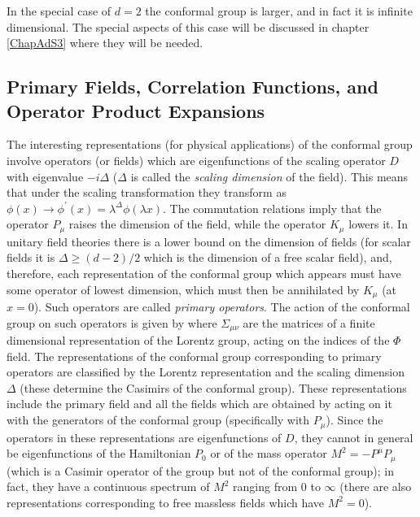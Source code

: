 In the special case of $d=2$ the conformal group is larger, and in
fact it is infinite dimensional. The special aspects of this case will
be discussed in chapter \ref{ChapAdS3} where they will be needed.

\subsection{Primary Fields, Correlation Functions, and Operator Product
Expansions}
\label{primaries}

The interesting representations (for physical applications) of the
conformal group involve operators (or fields) which are eigenfunctions
of the scaling operator $D$ with eigenvalue $-i\Delta$ ($\Delta$ is
called the {\it scaling dimension} of the field). This means that
under the scaling transformation  they transform as
$\phi(x) \to \phi^\prime(x) = \lambda^{\Delta} \phi(\lambda x)$. 
The commutation
relations  imply that the operator $P_\mu$
raises the dimension of the field, while the operator $K_\mu$ lowers
it. In unitary field theories there is a lower bound on the dimension
of fields (for scalar fields it is $\Delta \geq (d-2)/2$ which is the
dimension of a free scalar field), and, therefore, each representation
of the conformal group which appears must have some operator of lowest
dimension, which must then be annihilated by $K_\mu$ (at
$x=0$). Such operators are called {\it primary operators}. The action
of the conformal group on such operators is given by \cite{Mack:1969rr}
where $\Sigma_{\mu\nu}$ are the matrices of a finite dimensional
representation of the Lorentz group, acting on the indices of the
$\Phi$ field. The representations of the conformal group corresponding
to primary operators are classified by the Lorentz representation and
the scaling dimension $\Delta$ (these determine the Casimirs of the
conformal group).  These representations include the primary field and
all the fields which are obtained by acting on it with the generators
of the conformal group (specifically with $P_\mu$).  Since the
operators in these representations are eigenfunctions of $D$, they
cannot in general 
be eigenfunctions of the Hamiltonian $P_0$ or of the mass
operator $M^2 = -P^\mu P_\mu$ (which is a Casimir operator of the
\Poincare group but not of the conformal group); in fact, they have a
continuous spectrum of $M^2$ ranging from $0$ to $\infty$ (there are
also representations corresponding to free massless fields which have
$M^2=0$).

